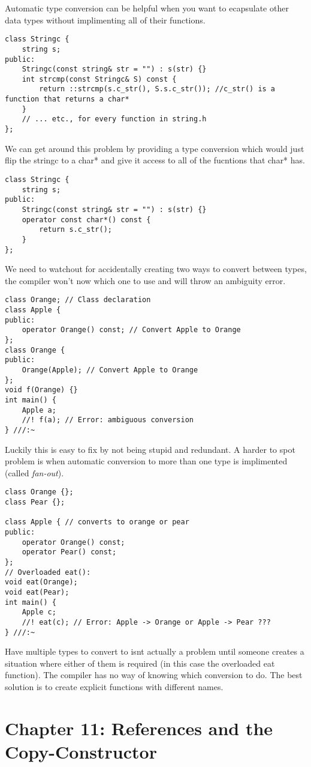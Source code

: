 \documentclass[12pt]{article}
\begin{document}
Automatic type conversion can be helpful when you want to ecapsulate other data types without implimenting all of their functions.
\begin{lstlisting}
class Stringc {
    string s;
public:
    Stringc(const string& str = "") : s(str) {}
    int strcmp(const Stringc& S) const {
        return ::strcmp(s.c_str(), S.s.c_str()); //c_str() is a function that returns a char*
    }
    // ... etc., for every function in string.h
};
\end{lstlisting}
We can get around this problem by providing a type conversion which would just flip the stringc to a char* and give it access to all of the fucntions that char* has.
\begin{lstlisting}
class Stringc {
    string s;
public:
    Stringc(const string& str = "") : s(str) {}
    operator const char*() const {
        return s.c_str();
    }
};
\end{lstlisting}
We need to watchout for accidentally creating two ways to convert between types, the compiler won't now which one to use and will throw an ambiguity error.
\begin{lstlisting}
class Orange; // Class declaration
class Apple {
public:
    operator Orange() const; // Convert Apple to Orange
};
class Orange {
public:
    Orange(Apple); // Convert Apple to Orange
};
void f(Orange) {}
int main() {
    Apple a;
    //! f(a); // Error: ambiguous conversion
} ///:~
\end{lstlisting}
Luckily this is easy to fix by not being stupid and redundant. A harder to spot problem is when automatic conversion to more than one type is implimented (called \textit{fan-out}).
\begin{lstlisting}
class Orange {};
class Pear {};

class Apple { // converts to orange or pear
public:
    operator Orange() const;
    operator Pear() const;
};
// Overloaded eat():
void eat(Orange);
void eat(Pear);
int main() {
    Apple c;
    //! eat(c); // Error: Apple -> Orange or Apple -> Pear ???
} ///:~
\end{lstlisting}
Have multiple types to convert to isnt actually a problem until someone creates a situation where either of them is required (in this case the overloaded eat function). The compiler has no way of knowing which conversion to do. The best solution is to create explicit functions with different names.


\section*{Chapter 11: References and the Copy-Constructor}
\end{document}
